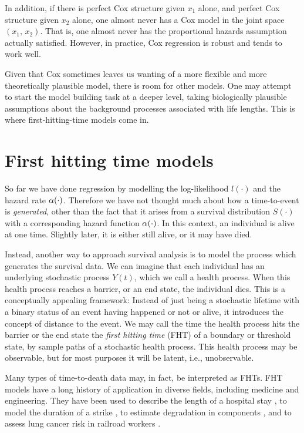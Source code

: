 In addition, if there is perfect Cox structure given $x_1$ alone, and perfect Cox structure given $x_2$ alone, one almost never has a Cox model in the joint space $(x_1,\,x_2)$.
That is, one almost never has the proportional hazards assumption actually satisfied.
However, in practice, Cox regression is robust and tends to work well.

Given that Cox sometimes leaves us wanting of a more flexible and more theoretically plausible model, there is room for other models.
One may attempt to start the model building task at a deeper level, taking biologically plausible assumptions about the background processes associated with life lengths.
This is where first-hitting-time models come in.

\section{First hitting time models}\label{sec:FHT}
So far we have done regression by modelling the log-likelihood $l(\cdot)$ and the hazard rate $\alpha(\cdot)$.
Therefore we have not thought much about how a time-to-event is \textit{generated}, other than the fact that it arises from a survival distribution $S(\cdot)$ with a corresponding hazard function $\alpha(\cdot)$.
In this context, an individual is alive at one time.
Slightly later, it is either still alive, or it may have died.

Instead, another way to approach survival analysis is to model the process which generates the survival data.
We can imagine that each individual has an underlying stochastic process $Y(t)$, which we call a health process.
When this health process reaches a barrier, or an end state, the individual dies.
This is a conceptually appealing framework:
Instead of just being a stochastic lifetime with a binary status of an event having happened or not or alive, it introduces the concept of distance to the event.
We may call the time the health process hits the barrier or the end state the \textit{first hitting time} (FHT) of a boundary or threshold state, by sample paths of a stochastic health process.
This health process may be observable, but for most purposes it will be latent, i.e., unobservable.

Many types of time-to-death data may, in fact, be interpreted as FHTs.
FHT models have a long history of application in diverse fields, including medicine and engineering.
They have been used to describe the length of a hospital stay \citep{whitmore1975,eaton-whitmore}, to model the duration of a strike \citep{lancaster}, to estimate degradation in components \citep{whitmore1995}, and to assess lung cancer risk in railroad workers \citep{leewhitmore2004}.

